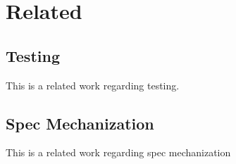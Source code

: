 \section{Related}\label{sec:related}

\subsection{\wasm Testing}
This is a related work regarding \wasm testing.

\subsection{Spec Mechanization}
This is a related work regarding spec mechanization
